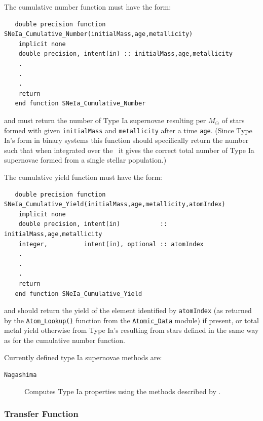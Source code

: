 The cumulative number function must have the form:
\begin{verbatim}
   double precision function SNeIa_Cumulative_Number(initialMass,age,metallicity)
    implicit none
    double precision, intent(in) :: initialMass,age,metallicity
    .
    .
    .
    return
   end function SNeIa_Cumulative_Number 
\end{verbatim}
and must return the number of Type Ia supernovae resulting per $M_\odot$ of stars formed with given {\tt initialMass} and {\tt metallicity} after a time {\tt age}. (Since Type Ia's form in binary systems this function should specifically return the number such that when integrated over the \IMF\ it gives the correct total number of Type Ia supernovae formed from a single stellar population.)

The cumulative yield function must have the form:
\begin{verbatim}
   double precision function SNeIa_Cumulative_Yield(initialMass,age,metallicity,atomIndex)
    implicit none
    double precision, intent(in)           :: initialMass,age,metallicity
    integer,          intent(in), optional :: atomIndex
    .
    .
    .
    return
   end function SNeIa_Cumulative_Yield 
\end{verbatim}
and should return the yield of the element identified by {\tt atomIndex} (as returned by the \hyperlink{atomic.data.F90:atomic_data:atom_lookup}{{\tt Atom\_Lookup()}} function from the \hyperlink{atomic.data.F90:atomic_data}{{\tt Atomic\_Data}} module) if present, or total metal yield otherwise from Type Ia's resulting from stars defined in the same way as for the cumulative number function.

Currently defined type Ia supernovae methods are:
\begin{description}
 \item [{\tt Nagashima}] Computes Type Ia properties using the methods described by \cite{nagashima_metal_2005}.
\end{description}

\subsubsection{Transfer Function}\label{sec:TransferFunctionMethod}


